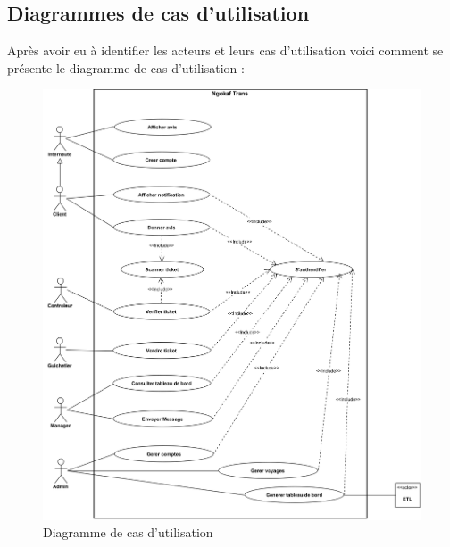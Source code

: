     \subsection[Diagrammes de cas d’utilisation]{Diagrammes de cas d’utilisation}
    Après avoir eu à identifier les acteurs et leurs cas d’utilisation
    voici comment se présente le diagramme de cas d’utilisation :
        \begin{figure}[H]
            \centering
            \includegraphics[width=150mm]{images/diagramme-de-cu/use-case.png}
            \caption{Diagramme de cas d’utilisation}
            \label{fig:dcu}
        \end{figure}
\pagebreak